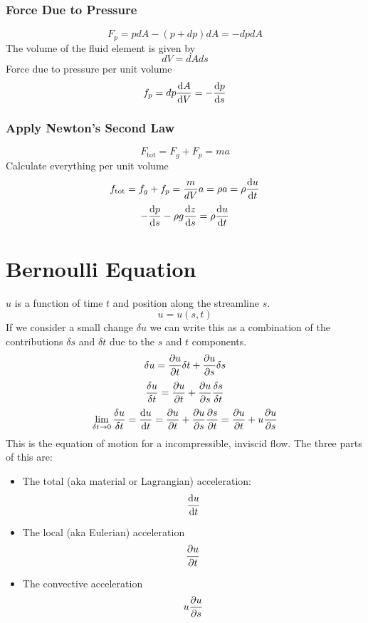 \documentclass{article}
\begin{document}
    \subsubsection*{Force Due to Pressure}
    \[F_p = p dA - (p + dp)dA = -dpdA\]
    The volume of the fluid element is given by
    \[dV = dAds\]
    Force due to pressure per unit volume
    \[f_p = dp\dv{A}{V} = -\dv{p}{s}\]
    
    \subsubsection*{Apply Newton's Second Law}
    \[F_\text{tot} = F_g + F_p = ma\]
    Calculate everything per unit volume
    \[f_\text{tot} = f_g + f_p = \frac{m}{dV}a = \rho a = \rho\dv{u}{t}\]
    \[-\dv{p}{s} - \rho g\dv{z}{s} = \rho\dv{u}{t}\]
    
    \section{Bernoulli Equation}
    \(u\) is a function of time \(t\) and position along the streamline \(s\).
    \[u = u(s, t)\]
    If we consider a small change \(\delta u\) we can write this as a combination of the contributions \(\delta s\) and \(\delta t\) due to the \(s\) and \(t\) components.
    \[\delta u = \pdv{u}{t}\delta t + \pdv{u}{s}\delta s\]
    \[\frac{\delta u}{\delta t} = \pdv{u}{t} + \pdv{u}{s}\frac{\delta s}{\delta t}\]
    \[\lim_{\delta t\to 0}\frac{\delta u}{\delta t} = \dv{u}{t} = \pdv{u}{t} + \pdv{u}{s}\pdv{s}{t} = \pdv{u}{t} + u\pdv{u}{s}\]
    This is the equation of motion for a incompressible, inviscid flow.
    The three parts of this are:
    \begin{itemize}
        \item The total (aka material or Lagrangian) acceleration:
        \[\dv{u}{t}\]
        \item The local (aka Eulerian) acceleration
        \[\pdv{u}{t}\]
        \item The convective acceleration
        \[u\pdv{u}{s}\]
    \end{itemize}
    
\end{document}
